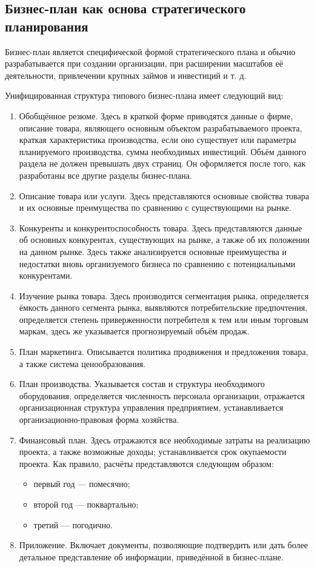 \documentclass[12pt, russian, oneside, article]{ncc}
\begin{document}
\subsection{Бизнес-план как основа стратегического планирования}
\label{sec-2_3}


Бизнес-план является специфической формой стратегического плана и обычно разрабатывается при создании организации, при расширении масштабов её деятельности, привлечении крупных займов и инвестиций и т. д.

Унифицированная структура типового бизнес-плана имеет следующий вид:
\begin{enumerate}
\item Обобщённое резюме. Здесь в краткой форме приводятся данные о фирме, описание товара, являющего основным объектом разрабатываемого проекта, краткая характеристика производства, если оно существует или параметры планируемого производства, сумма необходимых инвестиций. Объём данного раздела не должен превышать двух страниц. Он оформляется после того, как разработаны все другие разделы бизнес-плана.
\item Описание товара или услуги. Здесь представляются основные свойства товара и их основные преимущества по сравнению с существующими на рынке.
\item Конкуренты и конкурентоспособность товара. Здесь представляются данные об основных конкурентах, существующих на рынке, а также об их положении на данном рынке. Здесь также анализируется основные преимущества и недостатки вновь организуемого бизнеса по сравнению с потенциальными конкурентами.
\item Изучение рынка товара. Здесь производится сегментация рынка, определяется ёмкость данного сегмента рынка, выявляются потребительские предпочтения, определяется степень приверженности потребителя к тем или иным торговым маркам, здесь же указывается прогнозируемый объём продаж.
\item План маркетинга. Описывается политика продвижения и предложения товара, а также система ценообразования.
\item План производства. Указывается состав и структура необходимого оборудования, определяется численность персонала организации, отражается организационная структура управления предприятием, устанавливается организационно-правовая форма хозяйства.
\item Финансовый план. Здесь отражаются все необходимые затраты на реализацию проекта, а также возможные доходы; устанавливается срок окупаемости проекта. Как правило, расчёты представляются следующим образом:

\begin{itemize}
\item первый год --- помесячно;
\item второй год --- поквартально;
\item третий --- погодично.
\end{itemize}

\item Приложение. Включает документы, позволяющие подтвердить или дать более детальное представление об информации, приведённой в бизнес-плане.
\end{enumerate}
\end{document}
